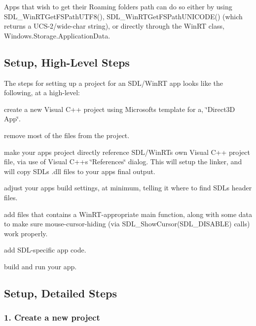 Apps that wish to get their Roaming folder\textquotesingle{}s path can do so either by using S\+D\+L\+\_\+\+Win\+R\+T\+Get\+F\+S\+Path\+U\+T\+F8(), S\+D\+L\+\_\+\+Win\+R\+T\+Get\+F\+S\+Path\+U\+N\+I\+C\+O\+D\+E() (which returns a U\+C\+S-\/2/wide-\/char string), or directly through the Win\+RT class, Windows.\+Storage.\+Application\+Data.

\subsection*{Setup, High-\/\+Level Steps }

The steps for setting up a project for an S\+D\+L/\+Win\+RT app looks like the following, at a high-\/level\+:


\begin{DoxyEnumerate}
\item create a new Visual C++ project using Microsoft\textquotesingle{}s template for a, \char`\"{}\+Direct3\+D App\char`\"{}.
\item remove most of the files from the project.
\item make your app\textquotesingle{}s project directly reference S\+D\+L/\+Win\+RT\textquotesingle{}s own Visual C++ project file, via use of Visual C++\textquotesingle{}s \char`\"{}\+References\char`\"{} dialog. This will setup the linker, and will copy S\+DL\textquotesingle{}s .dll files to your app\textquotesingle{}s final output.
\item adjust your app\textquotesingle{}s build settings, at minimum, telling it where to find S\+DL\textquotesingle{}s header files.
\item add files that contains a Win\+R\+T-\/appropriate main function, along with some data to make sure mouse-\/cursor-\/hiding (via S\+D\+L\+\_\+\+Show\+Cursor(\+S\+D\+L\+\_\+\+D\+I\+S\+A\+B\+L\+E) calls) work properly.
\item add S\+D\+L-\/specific app code.
\item build and run your app.
\end{DoxyEnumerate}

\subsection*{Setup, Detailed Steps }

\subsubsection*{1. Create a new project}

